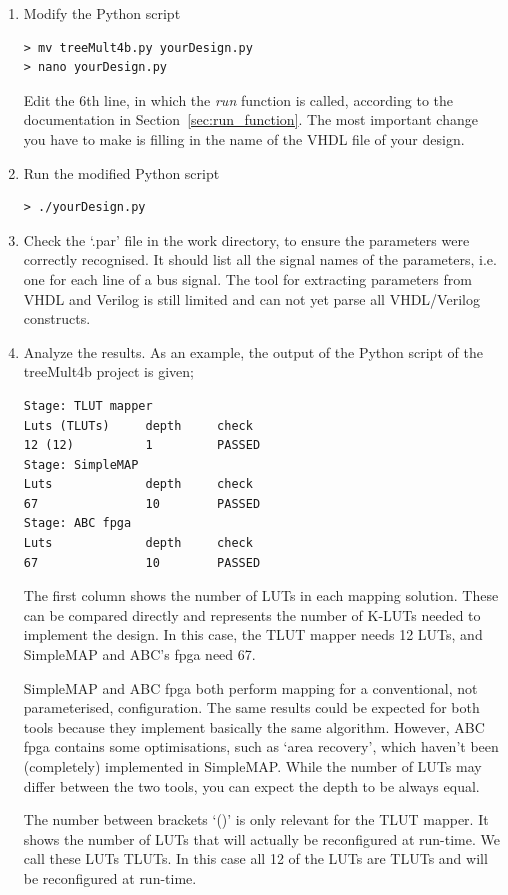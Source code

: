 \documentclass[a4paper,oneside]{memoir}
\begin{document}
\begin{enumerate}
\item Modify the Python script
\begin{lstlisting}
> mv treeMult4b.py yourDesign.py
> nano yourDesign.py
\end{lstlisting}
Edit the 6th line, in which the \emph{run} function is called, according to the documentation in Section~\ref{sec:run_function}. The most important change you have to make is filling in the name of the VHDL file of your design.

\item Run the modified Python script
\begin{lstlisting}
> ./yourDesign.py
\end{lstlisting}
\item \label{sec:check_par}Check the `.par' file in the work directory, to ensure the parameters were correctly recognised. It should list all the signal names of the parameters, i.e. one for each line of a bus signal. 
The tool for extracting parameters from VHDL and Verilog is still limited and can not yet parse all VHDL/Verilog constructs.
\item Analyze the results. As an example, the output of the Python script of the treeMult4b project is given;

\begin{lstlisting}
Stage: TLUT mapper
Luts (TLUTs)     depth     check
12 (12)          1         PASSED    
Stage: SimpleMAP
Luts             depth     check     
67               10        PASSED    
Stage: ABC fpga
Luts             depth     check     
67               10        PASSED 
\end{lstlisting}

The first column shows the number of LUTs in each mapping solution. These can be compared directly and represents the number of K-LUTs needed to implement the design. In this case, the TLUT mapper needs 12 LUTs, and SimpleMAP and ABC's fpga need 67.

SimpleMAP and ABC fpga both perform mapping for a conventional, not parameterised, configuration. The same results could be expected for both tools because they implement basically the same algorithm. However, ABC fpga contains some optimisations, such as `area recovery', which haven't been (completely) implemented in SimpleMAP. While the number of LUTs may differ between the two tools, you can expect the depth to be always equal.

The number between brackets `()' is only relevant for the TLUT mapper. It shows the number of LUTs that will actually be reconfigured at run-time. We call these LUTs TLUTs. In this case all 12 of the LUTs are TLUTs and will be reconfigured at run-time.


\end{enumerate}
\end{document}
